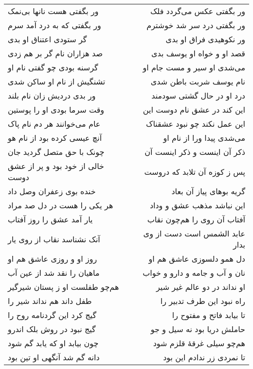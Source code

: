 \begin{center}
\begin{longtable}{l p{0.5cm} r}
ور بگفتی هست نانها بی‌نمک
&&
ور بگفتی عکس می‌گردد فلک
\\
ور بگفتی که به درد آمد سرم
&&
ور بگفتی درد سر شد خوشترم
\\
گر ستودی اعتناق او بدی
&&
ور نکوهیدی فراق او بدی
\\
صد هزاران نام گر بر هم زدی
&&
قصد او و خواه او یوسف بدی
\\
گرسنه بودی چو گفتی نام او
&&
می‌شدی او سیر و مست جام او
\\
تشنگیش از نام او ساکن شدی
&&
نام یوسف شربت باطن شدی
\\
ور بدی دردیش زان نام بلند
&&
درد او در حال گشتی سودمند
\\
وقت سرما بودی او را پوستین
&&
این کند در عشق نام دوست این
\\
عام می‌خوانند هر دم نام پاک
&&
این عمل نکند چو نبود عشقناک
\\
آنچ عیسی کرده بود از نام هو
&&
می‌شدی پیدا ورا از نام او
\\
چونک با حق متصل گردید جان
&&
ذکر آن اینست و ذکر اینست آن
\\
خالی از خود بود و پر از عشق دوست
&&
پس ز کوزه آن تلابد که دروست
\\
خنده بوی زعفران وصل داد
&&
گریه بوهای پیاز آن بعاد
\\
هر یکی را هست در دل صد مراد
&&
این نباشد مذهب عشق و وداد
\\
یار آمد عشق را روز آفتاب
&&
آفتاب آن روی را هم‌چون نقاب
\\
آنک نشناسد نقاب از روی یار
&&
عابد الشمس است دست از وی بدار
\\
روز او و روزی عاشق هم او
&&
دل همو دلسوزی عاشق هم او
\\
ماهیان را نقد شد از عین آب
&&
نان و آب و جامه و دارو و خواب
\\
هم‌چو طفلست او ز پستان شیرگیر
&&
او نداند در دو عالم غیر شیر
\\
طفل داند هم نداند شیر را
&&
راه نبود این طرف تدبیر را
\\
گیج کرد این گردنامه روح را
&&
تا بیابد فاتح و مفتوح را
\\
گیج نبود در روش بلک اندرو
&&
حاملش دریا بود نه سیل و جو
\\
چون بیابد او که یابد گم شود
&&
هم‌چو سیلی غرقهٔ قلزم شود
\\
دانه گم شد آنگهی او تین بود
&&
تا نمردی زر ندادم این بود
\\
\end{longtable}
\end{center}
